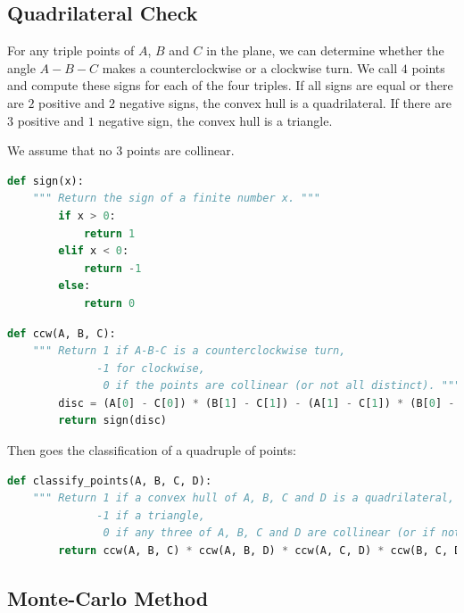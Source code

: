 \documentclass{article}
\begin{document}
\newpage

\subsection{Quadrilateral Check}

For any triple points of $A$, $B$ and $C$ in the plane, we can determine whether the angle $A-B-C$ makes a counterclockwise or a clockwise turn.
We call $4$ points and compute these signs for each of the four triples.
If all signs are equal or there are $2$ positive and $2$ negative signs, the convex hull is a quadrilateral.
If there are $3$ positive and $1$ negative sign, the convex hull is a triangle.

We assume that no $3$ points are collinear.

\begin{lstlisting}[language=Python, caption=Sign definition function.]
    def sign(x):
    """ Return the sign of a finite number x. """
        if x > 0:
            return 1
        elif x < 0:
            return -1
        else:
            return 0    
\end{lstlisting}

\begin{lstlisting}[language=Python, caption=Turn definition function.]
    def ccw(A, B, C):
    """ Return 1 if A-B-C is a counterclockwise turn, 
              -1 for clockwise,
               0 if the points are collinear (or not all distinct). """
        disc = (A[0] - C[0]) * (B[1] - C[1]) - (A[1] - C[1]) * (B[0] - C[0])
        return sign(disc)
\end{lstlisting}

Then goes the classification of a quadruple of points:
\begin{lstlisting}[language=Python, caption=Point classification function.]
    def classify_points(A, B, C, D):
    """ Return 1 if a convex hull of A, B, C and D is a quadrilateral,
              -1 if a triangle,
               0 if any three of A, B, C and D are collinear (or if not all points are distinct). """
        return ccw(A, B, C) * ccw(A, B, D) * ccw(A, C, D) * ccw(B, C, D)
\end{lstlisting}

\newpage

\subsection{Monte-Carlo Method}
\end{document}
